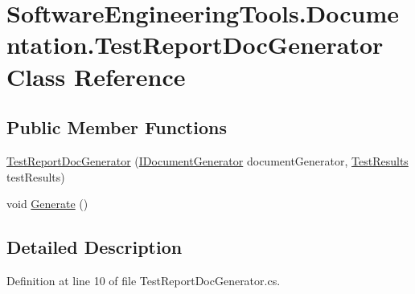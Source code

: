 \hypertarget{class_software_engineering_tools_1_1_documentation_1_1_test_report_doc_generator}{\section{Software\+Engineering\+Tools.\+Documentation.\+Test\+Report\+Doc\+Generator Class Reference}
\label{class_software_engineering_tools_1_1_documentation_1_1_test_report_doc_generator}
}
\subsection*{Public Member Functions}
\begin{DoxyCompactItemize}
\item 
\hyperlink{class_software_engineering_tools_1_1_documentation_1_1_test_report_doc_generator_afec6435bdf731581e37380223801af05}{Test\+Report\+Doc\+Generator} (\hyperlink{interface_software_engineering_tools_1_1_documentation_1_1_i_document_generator}{I\+Document\+Generator} document\+Generator, \hyperlink{class_software_engineering_tools_1_1_testing_1_1_test_results}{Test\+Results} test\+Results)
\item 
void \hyperlink{class_software_engineering_tools_1_1_documentation_1_1_test_report_doc_generator_a9ad34ec49fd12f6e2386ec343fd397ef}{Generate} ()
\end{DoxyCompactItemize}


\subsection{Detailed Description}


Definition at line 10 of file Test\+Report\+Doc\+Generator.\+cs.



